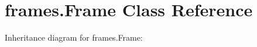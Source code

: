 \hypertarget{classframes_1_1Frame}{}\section{frames.\+Frame Class Reference}
\label{classframes_1_1Frame}


Inheritance diagram for frames.\+Frame\+:
